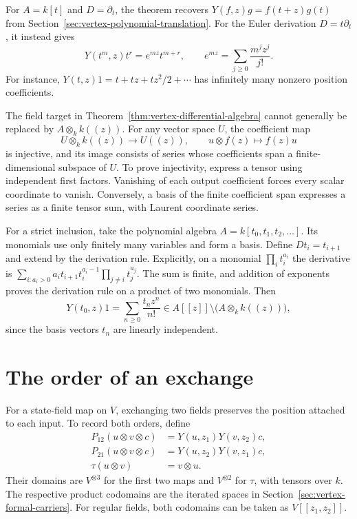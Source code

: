 For $A=k[t]$ and $D=\partial_t$, the theorem recovers
$Y(f,z)g=f(t+z)g(t)$ from Section~\ref{sec:vertex-polynomial-translation}.
For the Euler derivation $D=t\partial_t$, it instead gives
\[
 Y(t^m,z)t^r=e^{mz}t^{m+r},\qquad
 e^{mz}=\sum_{j\geq0}\frac{m^jz^j}{j!}.
\]
For instance, $Y(t,z)1=t+tz+tz^2/2+\cdots$ has infinitely many
nonzero position coefficients.

The field target in Theorem~\ref{thm:vertex-differential-algebra}
cannot generally be replaced by $A\otimes_k k((z))$.
For any vector space $U$, the coefficient map
\[
 U\otimes_k k((z))\longrightarrow U((z)),\qquad
 u\otimes f(z)\longmapsto f(z)u
\]
is injective, and its image consists of series whose coefficients
span a finite-dimensional subspace of $U$.
To prove injectivity, express a tensor using independent first factors.
Vanishing of each output coefficient forces every scalar coordinate to vanish.
Conversely, a basis of the finite coefficient span expresses a series
as a finite tensor sum, with Laurent coordinate series.

For a strict inclusion, take the polynomial algebra
$A=k[t_0,t_1,t_2,\ldots]$.
Its monomials use only finitely many variables and form a basis.
Define $Dt_i=t_{i+1}$ and extend by the derivation rule.
Explicitly, on a monomial $\prod_i t_i^{a_i}$ the derivative is
$\sum_{i:a_i>0}a_i t_{i+1}t_i^{a_i-1}\prod_{j\ne i}t_j^{a_j}$.
The sum is finite, and addition of exponents proves the derivation
rule on a product of two monomials.
Then
\[
 Y(t_0,z)1=\sum_{n\geq0}\frac{t_nz^n}{n!}
      \in A[[z]]\setminus\bigl(A\otimes_k k((z))\bigr),
\]
since the basis vectors $t_n$ are linearly independent.

\section{The order of an exchange}
\label{sec:vertex-exchange-order}

For a state-field map on $V$, exchanging two fields preserves
the position attached to each input.
To record both orders, define
\[
 \begin{aligned}
 P_{12}(u\otimes v\otimes c)&=Y(u,z_1)Y(v,z_2)c,\\
 P_{21}(u\otimes v\otimes c)&=Y(u,z_2)Y(v,z_1)c,\\
 \tau(u\otimes v)&=v\otimes u.
 \end{aligned}
\]
Their domains are $V^{\otimes3}$ for the first two maps and
$V^{\otimes2}$ for $\tau$, with tensors over $k$.
The respective product codomains are the iterated spaces in
Section~\ref{sec:vertex-formal-carriers}.
For regular fields, both codomains can be taken as $V[[z_1,z_2]]$.

